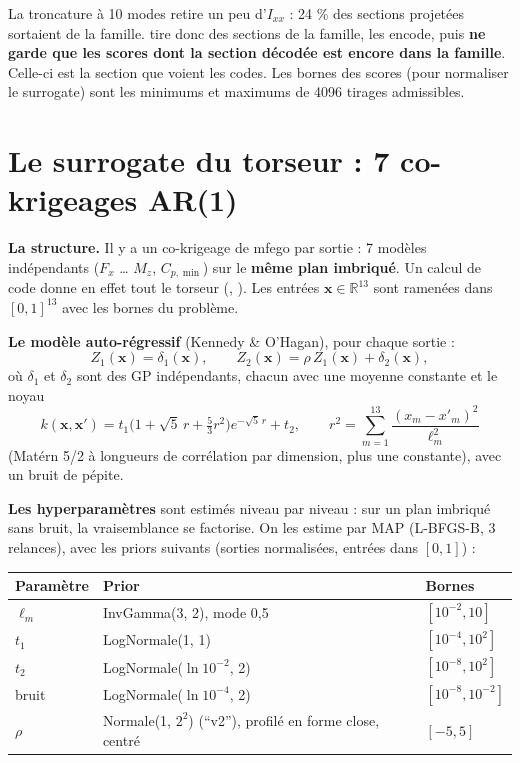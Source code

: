 \documentclass[10pt,a4paper]{article}
\newcommand{\vx}{\bm{x}}
\begin{document}
\begin{subtilite}
La troncature à 10 modes retire un peu d'$I_{xx}$ : 24 \% des sections projetées sortaient de la famille.
 tire donc des sections de la famille, les encode, puis \textbf{ne garde
que les scores dont la section décodée est encore dans la famille}. Celle-ci est la section que voient les
codes. Les bornes des scores (pour normaliser le surrogate) sont les minimums et maximums de 4096 tirages
admissibles.
\end{subtilite}

\section{Le surrogate du torseur : 7 co-krigeages AR(1)}
\label{sec:surrogate}
\textbf{La structure.} Il y a un co-krigeage  de mfego par sortie : 7 modèles indépendants
($F_x$ … $M_z$, $C_{p,\min}$) sur le \textbf{même plan imbriqué}. Un calcul de code donne en effet tout le
torseur (, ). Les entrées $\vx\in\mathbb{R}^{13}$ sont ramenées
dans $[0,1]^{13}$ avec les bornes du problème.

\textbf{Le modèle auto-régressif} (Kennedy \& O'Hagan), pour chaque sortie :
\[
  Z_1(\vx)=\delta_1(\vx),\qquad Z_2(\vx)=\rho\,Z_1(\vx)+\delta_2(\vx),
\]
où $\delta_1$ et $\delta_2$ sont des GP indépendants, chacun avec une moyenne constante et le noyau
\[
  k(\vx,\vx') = t_1\Big(1+\sqrt5\,r+\tfrac53 r^2\Big)e^{-\sqrt5\,r}+t_2,\qquad
  r^2=\sum_{m=1}^{13}\frac{(x_m-x'_m)^2}{\ell_m^2}
\]
(Matérn 5/2 à longueurs de corrélation par dimension, plus une constante), avec un bruit de pépite.

\textbf{Les hyperparamètres} sont estimés niveau par niveau : sur un plan imbriqué sans bruit, la
vraisemblance se factorise. On les estime par MAP (L-BFGS-B, 3 relances), avec les priors suivants
(sorties normalisées, entrées dans $[0,1]$) :

\begin{tabular}{@{}lll@{}}
\toprule
Paramètre & Prior & Bornes \\
\midrule
$\ell_m$ & InvGamma(3, 2), mode 0,5 & $[10^{-2},10]$ \\
$t_1$ & LogNormale(1, 1) & $[10^{-4},10^2]$ \\
$t_2$ & LogNormale($\ln 10^{-2}$, 2) & $[10^{-8},10^2]$ \\
bruit & LogNormale($\ln 10^{-4}$, 2) & $[10^{-8},10^{-2}]$ \\
$\rho$ & Normale(1, $2^2$) (\enquote{v2}), profilé en forme close, centré & $[-5,5]$ \\
\bottomrule
\end{tabular}
\end{document}
